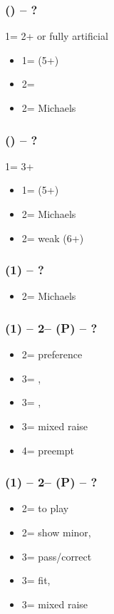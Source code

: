 \documentclass[12pt, a4paper]{article}
\begin{document}

\subsubsection*{(\alrts{1\clubs}) -- ?}
1\clubs = 2+ or fully artificial
\begin{itemize}
    \item 1\diams = \nat (5+)
    \item 2\clubs = \nat
    \item 2\diams = Michaels
\end{itemize}

\subsubsection*{(\alrts{1\clubs}) -- ?}
1\clubs = 3+
\begin{itemize}
    \item 1\diams = \nat (5+)
    \item 2\clubs = Michaels
    \item 2\diams = weak (6+)
\end{itemize}

\subsubsection*{(1\diams) -- ?}
\begin{itemize}
    \item 2\diams = Michaels
\end{itemize}

\subsubsection*{(1\diams) -- 2\diams -- (P) -- ?}
\begin{itemize}
    \item 2\major = preference
    \item 3\clubs = \hearts, \invp
    \item 3\diams = \spades, \invp
    \item 3\major = mixed raise
    \item 4\major = preempt
\end{itemize}

\subsubsection*{(1\hearts) -- 2\hearts -- (P) -- ?}
\begin{itemize}
    \item 2\spades = to play
    \item 2\nt = show minor, \invp
    \item 3\clubs = pass/correct
    \item 3\diams = \spades fit, \invp
    \item 3\spades = mixed raise
\end{itemize}
\end{document}
